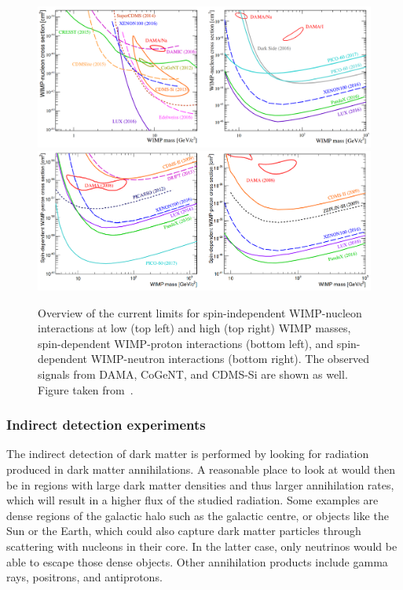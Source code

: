 \begin{figure}[ht]
  \centering
  \includegraphics[width=\textwidth]{spinindependent.png}\\
  \includegraphics[width=\textwidth]{spindependent.png}\hfill%
  \caption{Overview of the current limits for spin-independent \ac{WIMP}-nucleon interactions at low (top left) and high (top right) \ac{WIMP} masses, spin-dependent \ac{WIMP}-proton interactions (bottom left), and spin-dependent \ac{WIMP}-neutron interactions (bottom right). The observed signals from DAMA, CoGeNT, and CDMS-Si are shown as well. Figure taken from~\cite{Undagoitia:2015gya}.}
  \label{fig:direct_detection}
\end{figure}

\subsubsection{Indirect detection experiments}

The indirect detection of dark matter is performed by looking for radiation produced in dark matter annihilations. A reasonable place to look at would then be in regions with large dark matter densities and thus larger annihilation rates, which will result in a higher flux of the studied radiation. Some examples are dense regions of the galactic halo such as the galactic centre, or objects like the Sun or the Earth, which could also capture dark matter particles through scattering with nucleons in their core. In the latter case, only neutrinos would be able to escape those dense objects. Other annihilation products include gamma rays, positrons, and antiprotons.

